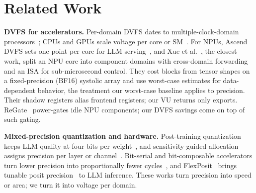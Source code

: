 \section{Related Work}
\label{sec:related}

\textbf{DVFS for accelerators.}
Per-domain DVFS dates to multiple-clock-domain processors~\cite{dvfs_mcd:hpca02}; CPUs and GPUs scale voltage per core or SM~\cite{fine_grained_dvfs:taco11,dvfs_gpu:amd:asplos23}.
For NPUs, Ascend DVFS sets one point per core for LLM serving~\cite{ascend_dvfs:asplos25}, and Xue et al.~\cite{xue2026finedvfs}, the closest work, split an NPU core into component domains with cross-domain forwarding and an ISA for sub-microsecond control.
They cost blocks from tensor shapes on a fixed-precision (BF16) systolic array and use worst-case estimates for data-dependent behavior, the treatment our worst-case baseline applies to precision.
Their shadow registers alias frontend registers; our VU returns only exports.
ReGate~\cite{regate:micro25} power-gates idle NPU components; our DVFS savings come on top of such gating.

\textbf{Mixed-precision quantization and hardware.}
Post-training quantization keeps LLM quality at four bits per weight~\cite{frantar2023gptq,lin2024awq}, and sensitivity-guided allocation assigns precision per layer or channel~\cite{dong2019hawq}.
Bit-serial and bit-composable accelerators turn lower precision into proportionally fewer cycles~\cite{judd2016stripes,sharma2018bitfusion}, and FlexPosit~\cite{gao2026flexposit} brings tunable posit precision~\cite{gustafson2017posit} to LLM inference.
These works turn precision into speed or area; we turn it into voltage per domain.
